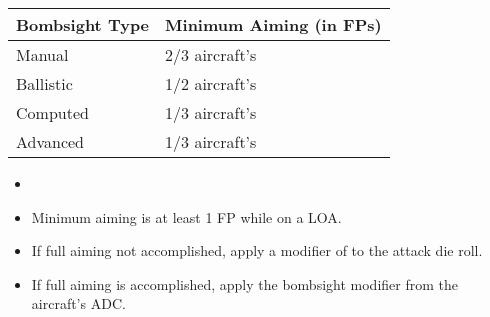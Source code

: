 
\begin{onecolumntablefloat}
\begin{onecolumntable}

\begin{tabularx}{0.7\linewidth}{lP}
\toprule
Bombsight Type  &Minimum Aiming (in FPs)\\
\midrule
Manual 	        &2/3 aircraft's \\
Ballistic	    &1/2 aircraft's \\
Computed	    &1/3 aircraft's \\
Advanced	    &1/3 aircraft's \\
\bottomrule
\end{tabularx}
\begin{tablenote}{0.7\linewidth}
\begin{itemize}
\item {}
\item Minimum aiming is at least 1 FP while on a LOA.
\item If full aiming not accomplished, apply a modifier of  to the attack die roll.
\item If full aiming is accomplished, apply the bombsight modifier from the aircraft's ADC.
\end{itemize}
\end{tablenote}

\end{onecolumntable}
\end{onecolumntablefloat}
